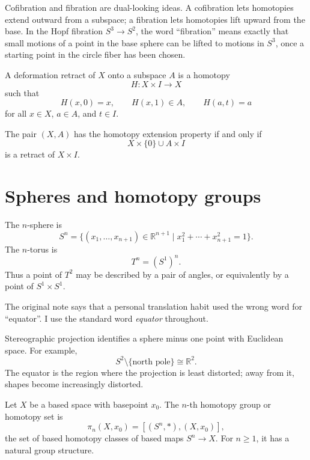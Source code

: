 \begin{remark}
Cofibration and fibration are dual-looking ideas.  A cofibration lets homotopies extend outward from a subspace; a fibration lets homotopies lift upward from the base.  In the Hopf fibration \(S^3\to S^2\), the word ``fibration'' means exactly that small motions of a point in the base sphere can be lifted to motions in \(S^3\), once a starting point in the circle fiber has been chosen.
\end{remark}

\begin{definition}
A deformation retract of \(X\) onto a subspace \(A\) is a homotopy
\[
  H:X\times I\to X
\]
such that
\[
  H(x,0)=x,\qquad H(x,1)\in A,\qquad H(a,t)=a
\]
for all \(x\in X\), \(a\in A\), and \(t\in I\).
\end{definition}

\begin{proposition}
The pair \((X,A)\) has the homotopy extension property if and only if
\[
  X\times\{0\}\cup A\times I
\]
is a retract of \(X\times I\).
\end{proposition}

\section{Spheres and homotopy groups}

The \(n\)-sphere is
\[
  S^n=\{(x_1,\dots,x_{n+1})\in\mathbb R^{n+1}\mid x_1^2+\cdots+x_{n+1}^2=1\}.
\]
The \(n\)-torus is
\[
  T^n=(S^1)^n.
\]
Thus a point of \(T^2\) may be described by a pair of angles, or equivalently by a point of \(S^1\times S^1\).

\begin{caution}
The original note says that a personal translation habit used the wrong word for ``equator''.  I use the standard word \emph{equator} throughout.
\end{caution}

Stereographic projection identifies a sphere minus one point with Euclidean space.  For example,
\[
  S^2\setminus\{\text{north pole}\}\cong\mathbb R^2.
\]
The equator is the region where the projection is least distorted; away from it, shapes become increasingly distorted.

\begin{definition}
Let \(X\) be a based space with basepoint \(x_0\).  The \(n\)-th homotopy group or homotopy set is
\[
  \pi_n(X,x_0)=[(S^n,*),(X,x_0)],
\]
the set of based homotopy classes of based maps \(S^n\to X\).  For \(n\ge1\), it has a natural group structure.
\end{definition}

